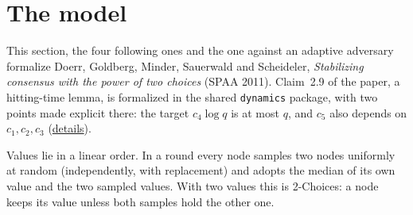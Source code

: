 \section{The model}\label{sec:dgmss-median}
This section, the four following ones and the one against an adaptive adversary formalize
Doerr, Goldberg, Minder, Sauerwald and Scheideler, \emph{Stabilizing consensus with the power of
two choices} (SPAA 2011). Claim~2.9 of the paper, a hitting-time lemma, is formalized in the
shared \texttt{dynamics} package, with two points made explicit there: the target $c_4\log q$ is
at most $q$, and $c_5$ also depends on $c_1,c_2,c_3$
(\href{https://github.com/formal-dynamics/leanamics/blob/main/dynamics/FORMALIZATION_DIFFERENCES.md#hitting-time-lemma-drifthitting-maj-8-doerr-et-al-spaa-2011-claim-29}{details}).
\begin{definition}\label{def:median}
\leanok
Values lie in a linear order. In a round every node samples two nodes uniformly at random
(independently, with replacement) and adopts the median of its own value and the two sampled
values. With two values this is 2-Choices: a node keeps its value unless both samples hold the
other one.
\end{definition}

